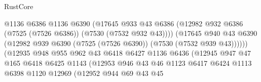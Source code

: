 \begin{lexlean}{RustCore}
\begin{coremodule}
                                        @1136
                                        @6386
                                        @1136
                                        @6390
                                        (@17645
                                          @933
                                          @43
                                          @6386
                                          (@12982
                                            @932
                                            @6386
                                            (@7525 (@7526 @6386))
                                            (@7530 (@7532 @932 @43))))
                                        (@17645
                                          @940
                                          @43
                                          @6390
                                          (@12982
                                            @939
                                            @6390
                                            (@7525 (@7526 @6390))
                                            (@7530 (@7532 @939 @43))))))
                                    (@12935
                                      @948
                                      @955
                                      @962
                                      @43
                                      @6418
                                      @6427
                                      @1136
                                      @6436
                                      (@12945
                                        @947
                                        @47
                                        @165
                                        @6418
                                        @6425
                                        @1143
                                        (@12953
                                          @946
                                          @43
                                          @46
                                          @1123
                                          @6417
                                          @6424
                                          @1113
                                          @6398
                                          @1120
                                          @12969
                                          (@12952
                                            @944
                                            @69
                                            @43
                                            @45

\end{coremodule}
\end{lexlean}

